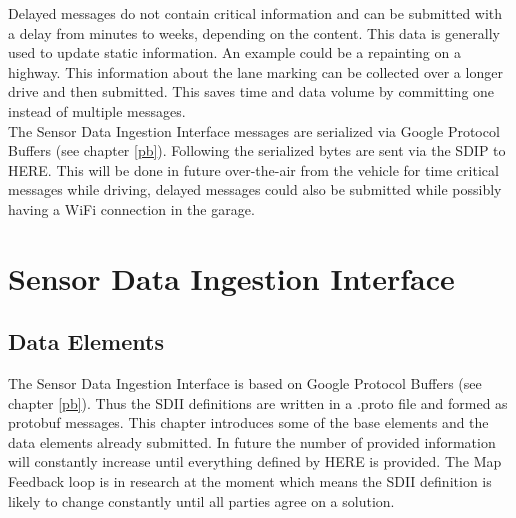 Delayed messages do not contain critical information and can be submitted with a delay from minutes to weeks, depending on the content. This data is generally used to update static information. An example could be a repainting on a highway. This information about the lane marking can be collected over a longer drive and then submitted. This saves time and data volume by committing one instead of multiple messages.\\
The Sensor Data Ingestion Interface messages are serialized via Google Protocol Buffers (see chapter \ref{pb}). Following the serialized bytes are sent via the \ac{SDIP} to HERE. This will be done in future over-the-air from the vehicle for time critical messages while driving, delayed messages could also be submitted while possibly having a WiFi connection in the garage.
\section{Sensor Data Ingestion Interface}
\label{mfl_sdii_overview}
\subsection{Data Elements}
\label{mfl_sdii_content}
The Sensor Data Ingestion Interface is based on Google Protocol Buffers (see chapter \ref{pb}). Thus the SDII definitions are written in a .proto file and formed as protobuf messages. This chapter introduces some of the base elements and the data elements already submitted. In future the number of provided information will constantly increase until everything defined by HERE is provided. The Map Feedback loop is in research at the moment which means the SDII definition is likely to change constantly until all parties agree on a solution.
